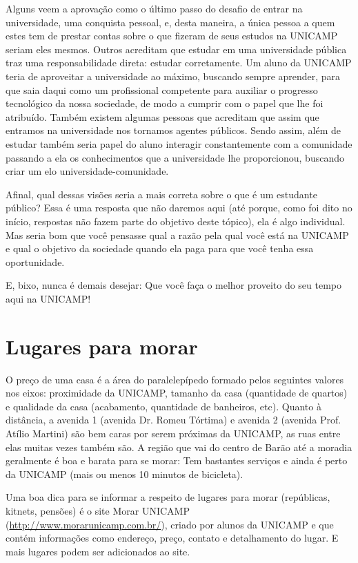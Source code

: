 \documentclass[a4paper,10pt, twocolumn]{article}
\begin{document}
Alguns veem a aprovação como o último passo do desafio de entrar na
universidade, uma conquista pessoal, e, desta maneira, a única pessoa a quem
estes tem de prestar contas sobre o que fizeram de seus estudos na UNICAMP
seriam eles mesmos. Outros acreditam que estudar em uma universidade pública
traz uma responsabilidade direta: estudar corretamente. Um aluno da UNICAMP
teria de aproveitar a universidade ao máximo, buscando sempre aprender, para que
saia daqui como um profissional competente para auxiliar o progresso tecnológico
da nossa sociedade, de modo a cumprir com o papel que lhe foi atribuído. Também
existem algumas pessoas que acreditam que assim que entramos na universidade nos
tornamos agentes públicos. Sendo assim, além de estudar também seria papel do
aluno interagir constantemente com a comunidade passando a ela os conhecimentos
que a universidade lhe proporcionou, buscando criar um elo
universidade-comunidade.

Afinal, qual dessas visões seria a mais correta sobre o que é um estudante
público? Essa é uma resposta que não daremos aqui (até porque, como foi dito no
início, respostas não fazem parte do objetivo deste tópico), ela é algo
individual. Mas seria bom que você pensasse qual a razão pela qual você está na
UNICAMP e qual o objetivo da sociedade quando ela paga para que você tenha essa
oportunidade.

E, bixo, nunca é demais desejar: Que você faça o melhor proveito do seu tempo
aqui na UNICAMP!

\section{Lugares para morar}
O preço de uma casa é a área do paralelepípedo formado pelos seguintes valores
nos eixos: proximidade da UNICAMP, tamanho da casa (quantidade de quartos)
e qualidade da casa (acabamento, quantidade de banheiros, etc). Quanto
à distância, a avenida 1 (avenida Dr. Romeu Tórtima) e avenida 2 (avenida Prof.
Atílio Martini) são bem caras por serem próximas da UNICAMP, as ruas entre elas
muitas vezes também são. A região que vai do centro de Barão até a moradia
geralmente é boa e barata para se morar: Tem bastantes serviços e ainda é perto
da UNICAMP (mais ou menos 10 minutos de bicicleta).

Uma boa dica para se informar a respeito de lugares para morar (repúblicas,
kitnets, pensões) é o site Morar UNICAMP
(\url{http://www.morarunicamp.com.br/}), criado por alunos da UNICAMP e que
contém informações como endereço, preço, contato e detalhamento do lugar. E mais
lugares podem ser adicionados ao site.
\end{document}
